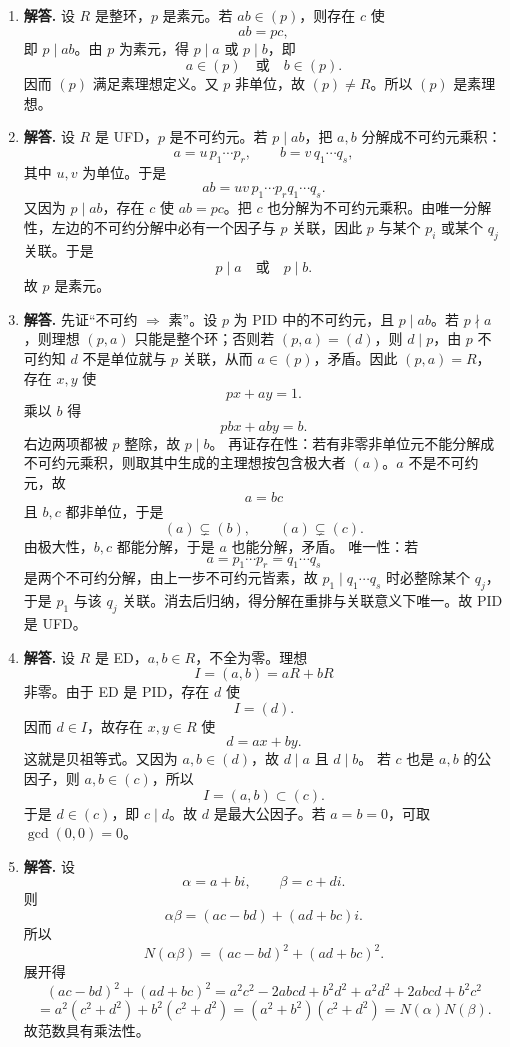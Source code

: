 \begin{enumerate}[label=\textbf{\arabic*.}, leftmargin=*, itemsep=1em]
  \item \textbf{解答.} 设 $R$ 是整环，$p$ 是素元。若 $ab\in(p)$，则存在 $c$ 使
  \[
  ab=pc,
  \]
  即 $p\mid ab$。由 $p$ 为素元，得 $p\mid a$ 或 $p\mid b$，即
  \[
  a\in(p)\quad\text{或}\quad b\in(p).
  \]
  因而 $(p)$ 满足素理想定义。又 $p$ 非单位，故 $(p)\neq R$。所以 $(p)$ 是素理想。

  \item \textbf{解答.} 设 $R$ 是 UFD，$p$ 是不可约元。若 $p\mid ab$，把 $a,b$ 分解成不可约元乘积：
  \[
  a=u\,p_1\cdots p_r,\qquad b=v\,q_1\cdots q_s,
  \]
  其中 $u,v$ 为单位。于是
  \[
  ab=uv\,p_1\cdots p_r q_1\cdots q_s.
  \]
  又因为 $p\mid ab$，存在 $c$ 使 $ab=pc$。把 $c$ 也分解为不可约元乘积。由唯一分解性，左边的不可约分解中必有一个因子与 $p$ 关联，因此 $p$ 与某个 $p_i$ 或某个 $q_j$ 关联。于是
  \[
  p\mid a\quad\text{或}\quad p\mid b.
  \]
  故 $p$ 是素元。

  \item \textbf{解答.} 先证“不可约 $\Rightarrow$ 素”。设 $p$ 为 PID 中的不可约元，且 $p\mid ab$。若 $p\nmid a$，则理想 $(p,a)$ 只能是整个环；否则若 $(p,a)=(d)$，则 $d\mid p$，由 $p$ 不可约知 $d$ 不是单位就与 $p$ 关联，从而 $a\in(p)$，矛盾。因此 $(p,a)=R$，存在 $x,y$ 使
  \[
  px+ay=1.
  \]
  乘以 $b$ 得
  \[
  pbx+aby=b.
  \]
  右边两项都被 $p$ 整除，故 $p\mid b$。  
  再证存在性：若有非零非单位元不能分解成不可约元乘积，则取其中生成的主理想按包含极大者 $(a)$。$a$ 不是不可约元，故
  \[
  a=bc
  \]
  且 $b,c$ 都非单位，于是
  \[
  (a)\subsetneq (b),\qquad (a)\subsetneq (c).
  \]
  由极大性，$b,c$ 都能分解，于是 $a$ 也能分解，矛盾。  
  唯一性：若
  \[
  a=p_1\cdots p_r=q_1\cdots q_s
  \]
  是两个不可约分解，由上一步不可约元皆素，故 $p_1\mid q_1\cdots q_s$ 时必整除某个 $q_j$，于是 $p_1$ 与该 $q_j$ 关联。消去后归纳，得分解在重排与关联意义下唯一。故 PID 是 UFD。

  \item \textbf{解答.} 设 $R$ 是 ED，$a,b\in R$，不全为零。理想
  \[
  I=(a,b)=aR+bR
  \]
  非零。由于 ED 是 PID，存在 $d$ 使
  \[
  I=(d).
  \]
  因而 $d\in I$，故存在 $x,y\in R$ 使
  \[
  d=ax+by.
  \]
  这就是贝祖等式。又因为 $a,b\in(d)$，故 $d\mid a$ 且 $d\mid b$。  
  若 $c$ 也是 $a,b$ 的公因子，则 $a,b\in(c)$，所以
  \[
  I=(a,b)\subset(c).
  \]
  于是 $d\in(c)$，即 $c\mid d$。故 $d$ 是最大公因子。若 $a=b=0$，可取 $\gcd(0,0)=0$。

  \item \textbf{解答.} 设
  \[
  \alpha=a+bi,\qquad \beta=c+di.
  \]
  则
  \[
  \alpha\beta=(ac-bd)+(ad+bc)i.
  \]
  所以
  \[
  N(\alpha\beta)=(ac-bd)^2+(ad+bc)^2.
  \]
  展开得
  \[
  (ac-bd)^2+(ad+bc)^2
  =a^2c^2-2abcd+b^2d^2+a^2d^2+2abcd+b^2c^2
  \]
  \[
  =a^2(c^2+d^2)+b^2(c^2+d^2)
  =(a^2+b^2)(c^2+d^2)
  =N(\alpha)N(\beta).
  \]
  故范数具有乘法性。


\end{enumerate}
